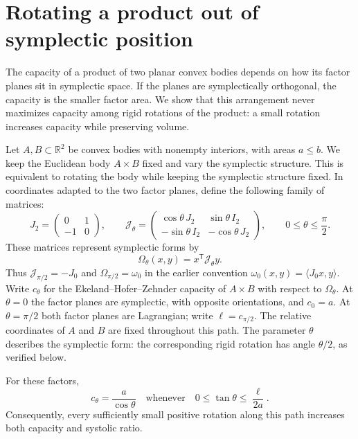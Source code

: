 \section{Rotating a product out of symplectic position}
\label{sec:product-rotation}

The capacity of a product of two planar convex bodies depends on how its
factor planes sit in symplectic space. If the planes are symplectically
orthogonal, the capacity is the smaller factor area. We show that this
arrangement never maximizes capacity among rigid rotations of the product:
a small rotation increases capacity while preserving volume.

Let $A,B\subset\mathbb R^2$ be convex bodies with nonempty interiors, with
areas $a\le b$. We keep the Euclidean body $A\times B$ fixed and vary the
symplectic structure. This is equivalent to rotating the body while keeping
the symplectic structure fixed. In coordinates adapted to the two factor
planes, define the following family of matrices:
\[
 J_2=\begin{pmatrix}0&1\\-1&0\end{pmatrix},\qquad
 \mathcal J_\theta=
 \begin{pmatrix}
  \cos\theta\,J_2&\sin\theta\,I_2\\
  -\sin\theta\,I_2&-\cos\theta\,J_2
 \end{pmatrix},
 \qquad 0\le\theta\le\frac\pi2.
\]
These matrices represent symplectic forms by
\[
 \Omega_\theta(x,y)=x^{\mathsf T}\mathcal J_\theta y.
\]
Thus $\mathcal J_{\pi/2}=-J_0$ and $\Omega_{\pi/2}=\omega_0$ in the
earlier convention $\omega_0(x,y)=\langle J_0x,y\rangle$.
Write $c_\theta$ for the Ekeland--Hofer--Zehnder capacity of $A\times B$
with respect to $\Omega_\theta$.
At $\theta=0$ the factor planes are symplectic, with opposite
orientations, and $c_0=a$. At $\theta=\pi/2$ both factor planes are Lagrangian;
write $\ell=c_{\pi/2}$. The relative coordinates of $A$ and $B$ are fixed
throughout this path. The parameter $\theta$ describes the symplectic form:
the corresponding rigid rotation has angle $\theta/2$, as verified below.

\begin{theorem}\label{thm:product-initial-rotation}
For these factors,
\[
 c_\theta=\frac{a}{\cos\theta}
 \quad\text{whenever}\quad
 0\le\tan\theta\le\frac{\ell}{2a}.
\]
Consequently, every sufficiently small positive rotation along this path
increases both capacity and systolic ratio.
\end{theorem}

